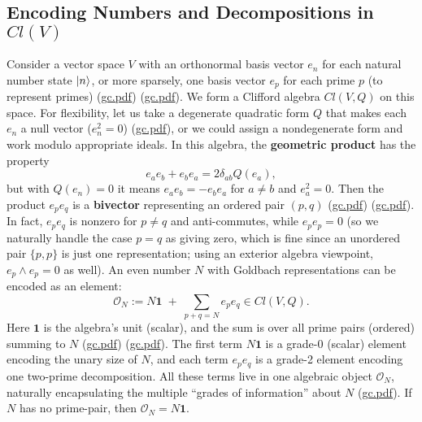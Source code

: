 \documentclass[12pt]{article}
\begin{document}
\subsection{Encoding Numbers and Decompositions in $Cl(V)$}
Consider a vector space $V$ with an orthonormal basis vector $e_n$ for each natural number state $\ket{n}$, or more sparsely, one basis vector $e_p$ for each prime $p$ (to represent primes) (\href{file://file-7ZYYwSHWVa83XEVTrEhg5z#:~:text=Clifford%20algebra%20to%20take%20advantage,product%20%24e_p%20e_q%24%20could%20be}{gc.pdf}) (\href{file://file-7ZYYwSHWVa83XEVTrEhg5z#:~:text=%28spin%20groups%29,Indeed%2C%20Clifford%20algebras%20naturally%20encode}{gc.pdf}). We form a Clifford algebra $Cl(V,Q)$ on this space. For flexibility, let us take a degenerate quadratic form $Q$ that makes each $e_n$ a null vector ($e_n^2=0$) (\href{file://file-7ZYYwSHWVa83XEVTrEhg5z#:~:text=geometric%20product%20,g}{gc.pdf}), or we could assign a nondegenerate form and work modulo appropriate ideals. In this algebra, the \textbf{geometric product} has the property
\[
e_a e_b + e_b e_a = 2\delta_{ab} Q(e_a),
\]
but with $Q(e_n)=0$ it means $e_a e_b = - e_b e_a$ for $a\neq b$ and $e_a^2=0$. Then the product $e_p e_q$ is a \textbf{bivector} representing an ordered pair $(p,q)$ (\href{file://file-7ZYYwSHWVa83XEVTrEhg5z#:~:text=%24e_p%24%29,2%3D0%24%20%28a%20degenerate%20form%29%20or}{gc.pdf}) (\href{file://file-7ZYYwSHWVa83XEVTrEhg5z#:~:text=vectors%20either%20orthogonal%20or%20something,be%20a%20formal%20bivector%20corresponding}{gc.pdf}). In fact, $e_p e_q$ is nonzero for $p\neq q$ and anti-commutes, while $e_p e_p = 0$ (so we naturally handle the case $p=q$ as giving zero, which is fine since an unordered pair $\{p,p\}$ is just one representation; using an exterior algebra viewpoint, $e_p \wedge e_p = 0$ as well). An even number $N$ with Goldbach representations can be encoded as an element:
\[
\mathcal{O}_N := N\mathbf{1} \;+\; \sum_{p+q=N} e_p e_q \in Cl(V,Q).
\]
Here $\mathbf{1}$ is the algebra’s unit (scalar), and the sum is over all prime pairs (ordered) summing to $N$ (\href{file://file-7ZYYwSHWVa83XEVTrEhg5z#:~:text=the%20Clifford%20algebra%20can%20represent,to%20encode%20these%20different%20grades}{gc.pdf}) (\href{file://file-7ZYYwSHWVa83XEVTrEhg5z#:~:text=could%20be%20an%20element%20of,to%20encode%20these%20different%20grades}{gc.pdf}). The first term $N\mathbf{1}$ is a grade-0 (scalar) element encoding the unary size of $N$, and each term $e_p e_q$ is a grade-2 element encoding one two-prime decomposition. All these terms live in one algebraic object $\mathcal{O}_N$, naturally encapsulating the multiple “grades of information” about $N$ (\href{file://file-7ZYYwSHWVa83XEVTrEhg5z#:~:text=the%20unit%20%24%5Cmathbf,part%2C%20analogous%20to%20our%20Lie}{gc.pdf}). If $N$ has no prime-pair, then $\mathcal{O}_N = N\mathbf{1}$.
\end{document}

